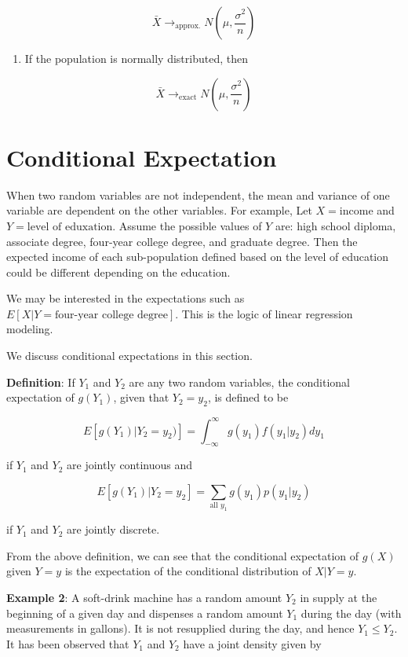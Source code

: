 \documentclass[
]{book}
\providecommand{\tightlist}{%
  \setlength{\itemsep}{0pt}\setlength{\parskip}{0pt}}
\begin{document}
\[
\bar{X} \to_{\text{approx.}} N\left(\mu, \frac{\sigma^2}{n} \right)
\]

\begin{enumerate}
\def\labelenumi{\arabic{enumi}.}
\setcounter{enumi}{1}
\tightlist
\item
  If the population is normally distributed, then
\end{enumerate}

\[
\bar{X} \to_{\text{exact}} N\left(\mu, \frac{\sigma^2}{n} \right)
\]

\hypertarget{conditional-expectation}{%
\section{Conditional Expectation}\label{conditional-expectation}}

When two random variables are not independent, the mean and variance of one variable are dependent on the other variables. For example, Let \(X = \text{income}\) and \(Y = \text{level of eduxation}\). Assume the possible values of \(Y\) are: high school diploma, associate degree, four-year college degree, and graduate degree. Then the expected income of each sub-population defined based on the level of education could be different depending on the education.

We may be interested in the expectations such as \(E\left[X| Y = \text{four-year college degree}\right]\). This is the logic of linear regression modeling.

We discuss conditional expectations in this section.

\textbf{Definition}: If \(Y_1\) and \(Y_2\) are any two random variables, the conditional expectation of \(g(Y_1)\), given that \(Y_2 = y_2\), is defined to be

\[
E[g(Y_1) | Y_2 = y_2)] = \int_{-\infty}^\infty
g(y_1) f (y_1 | y_2) dy_1
\]

if \(Y_1\) and \(Y_2\) are jointly continuous and

\[
E[g(Y_1) | Y_2 = y_2] = \sum_{\text{all }y_1} g(y_1)p(y_1 | y_2)
\]

if \(Y_1\) and \(Y_2\) are jointly discrete.

From the above definition, we can see that the conditional expectation of \(g(X)\) given \(Y=y\) is the expectation of the conditional distribution of \(X|Y=y\).

\hfill\break

\textbf{Example 2}: A soft-drink machine has a random amount \(Y_2\) in supply at the beginning of a given day and dispenses a random amount \(Y_1\) during the day (with measurements in gallons). It is not resupplied during the day, and hence \(Y_1 \le Y_2\). It has been observed that \(Y_1\) and \(Y_2\) have a joint density given by
\end{document}
